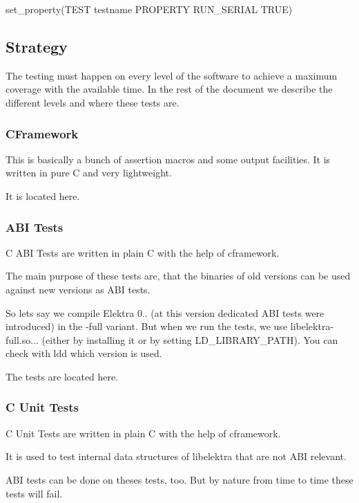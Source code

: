 \begin{DoxyCode}
set\_property(TEST testname PROPERTY RUN\_SERIAL TRUE)
\end{DoxyCode}


\subsection*{Strategy}

The testing must happen on every level of the software to achieve a maximum coverage with the available time. In the rest of the document we describe the different levels and where these tests are.

\subsubsection*{C\+Framework}

This is basically a bunch of assertion macros and some output facilities. It is written in pure C and very lightweight.

It is located here.

\subsubsection*{A\+BI Tests}

C A\+BI Tests are written in plain C with the help of {\ttfamily cframework}.

The main purpose of these tests are, that the binaries of old versions can be used against new versions as A\+BI tests.

So lets say we compile Elektra 0.. (at this version dedicated A\+BI tests were introduced) in the {\ttfamily -\/full} variant. But when we run the tests, we use {\ttfamily libelektra-\/full.\+so...} (either by installing it or by setting {\ttfamily L\+D\+\_\+\+L\+I\+B\+R\+A\+R\+Y\+\_\+\+P\+A\+TH}). You can check with {\ttfamily ldd} which version is used.

The tests are located here.

\subsubsection*{C Unit Tests}

C Unit Tests are written in plain C with the help of {\ttfamily cframework}.

It is used to test internal data structures of libelektra that are not A\+BI relevant.

A\+BI tests can be done on theses tests, too. But by nature from time to time these tests will fail.

